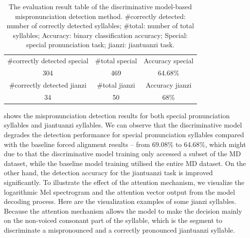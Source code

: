 \begin{table}[ht!]
\centering
\caption{The evaluation result table of the discriminative model-based mispronunciation detection method. \#correctly detected: number of correctly detected syllables; \#total: number of total syllables; Accuracy: binary classification accuracy; Special: special pronunciation task; jianzi: jiantuanzi task.}
\label{tab:ch6:results_discriminative_eval}
\begin{tabular}{ccc}
\toprule
\#correctly detected special & \#total special & Accuracy special \\
304 & 469 & 64.68\% \\
\midrule
\#correctly detected jianzi & \#total jianzi & Accuracy jianzi \\
34 & 50 & 68\% \\
\bottomrule
\end{tabular}
\end{table}

 shows the mispronunciation detection results for both special pronunciation syllables and jiantuanzi syllables. We can observe that the discriminative model degrades the detection performance for special pronunciation syllables compared with the baseline forced alignment results -- from 69.08\% to 64.68\%, which might due to that the discriminative model training only accessed a subset of the MD dataset, while the baseline model training utilised the entire MD dataset. On the other hand, the detection accuracy for the jiantuanzi task is improved significantly. To illustrate the effect of the attention mechanism, we visualize the logarithmic Mel spectrogram and the attention vector output from the model decoding process. Here are the visualization examples of some jianzi syllables. Because the attention mechanism allows the model to make the decision mainly on the non-voiced consonant part of the syllable, which is the segment to discriminate a mispronounced and a correctly pronounced jiantuanzi syllable.

